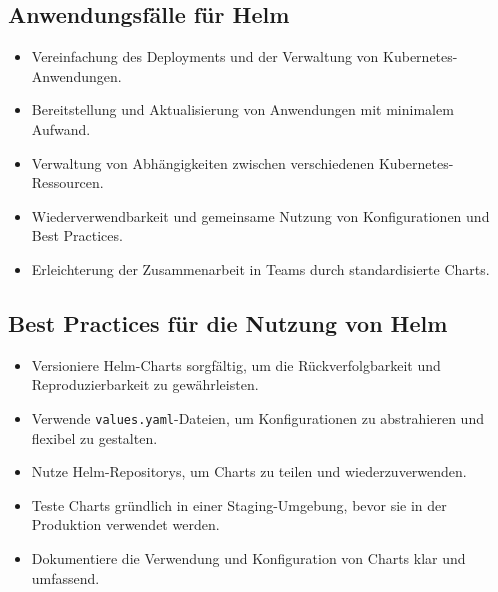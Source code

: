 \subsection{Anwendungsfälle für Helm}
\begin{itemize}
    \item Vereinfachung des Deployments und der Verwaltung von Kubernetes-Anwendungen.
    \item Bereitstellung und Aktualisierung von Anwendungen mit minimalem Aufwand.
    \item Verwaltung von Abhängigkeiten zwischen verschiedenen Kubernetes-Ressourcen.
    \item Wiederverwendbarkeit und gemeinsame Nutzung von Konfigurationen und Best Practices.
    \item Erleichterung der Zusammenarbeit in Teams durch standardisierte Charts.
\end{itemize}

\subsection{Best Practices für die Nutzung von Helm}
\begin{itemize}
    \item Versioniere Helm-Charts sorgfältig, um die Rückverfolgbarkeit und Reproduzierbarkeit zu gewährleisten.
    \item Verwende \texttt{values.yaml}-Dateien, um Konfigurationen zu abstrahieren und flexibel zu gestalten.
    \item Nutze Helm-Repositorys, um Charts zu teilen und wiederzuverwenden.
    \item Teste Charts gründlich in einer Staging-Umgebung, bevor sie in der Produktion verwendet werden.
    \item Dokumentiere die Verwendung und Konfiguration von Charts klar und umfassend.
\end{itemize}

